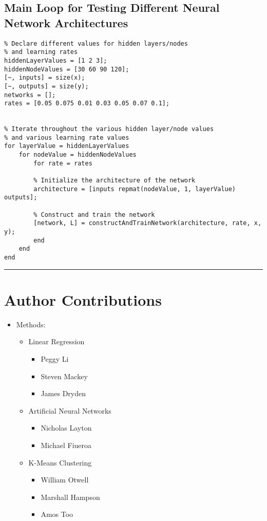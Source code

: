 \documentclass[12pt]{article}
\newcommand{\horizontalLine}{
	\begin{center}
		\hrule width 1.0\textwidth
	\end{center}
}
\begin{document}
\subsection{Main Loop for Testing Different Neural Network Architectures}
\label{subsec:annLoop}
\begin{lstlisting}
% Declare different values for hidden layers/nodes
% and learning rates
hiddenLayerValues = [1 2 3];
hiddenNodeValues = [30 60 90 120];
[~, inputs] = size(x);
[~, outputs] = size(y);
networks = [];
rates = [0.05 0.075 0.01 0.03 0.05 0.07 0.1];


% Iterate throughout the various hidden layer/node values
% and various learning rate values
for layerValue = hiddenLayerValues
    for nodeValue = hiddenNodeValues
        for rate = rates
        
        % Initialize the architecture of the network
        architecture = [inputs repmat(nodeValue, 1, layerValue) outputs];
        
        % Construct and train the network
        [network, L] = constructAndTrainNetwork(architecture, rate, x, y);
        end
    end
end
\end{lstlisting}

\horizontalLine
\section{Author Contributions}
\label{sec:authorContributions}

\begin{itemize}
    \item Methods:
    \begin{itemize}
        \item Linear Regression
        \begin{itemize}
            \item Peggy Li
            \item Steven Mackey
            \item James Dryden
        \end{itemize}
        \item Artificial Neural Networks
        \begin{itemize}
            \item Nicholas Layton
            \item Michael Fiueroa
        \end{itemize}
        \item K-Means Clustering
        \begin{itemize}
            \item William Otwell
            \item Marshall Hampson
            \item Amos Too
        \end{itemize}
    \end{itemize}
\end{itemize}
\end{document}
